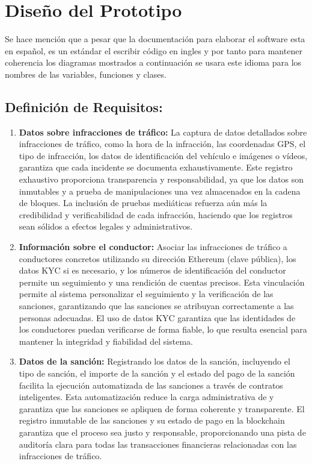 \section{Diseño del Prototipo }
Se hace mención que a pesar que la documentación para elaborar el software esta en español, es un estándar el escribir código en ingles y por tanto para mantener coherencia los diagramas mostrados a continuación se usara este idioma para los nombres de las variables, funciones y clases.
\subsection{Definición de Requisitos:  }
    
\begin{enumerate}
    \item \textbf{Datos sobre infracciones de tráfico:} La captura de datos detallados sobre infracciones de tráfico, como la hora de la infracción, las coordenadas GPS, el tipo de infracción, los datos de identificación del vehículo e imágenes o vídeos, garantiza que cada incidente se documenta exhaustivamente. Este registro exhaustivo proporciona transparencia y responsabilidad, ya que los datos son inmutables y a prueba de manipulaciones una vez almacenados en la cadena de bloques. La inclusión de pruebas mediáticas refuerza aún más la credibilidad y verificabilidad de cada infracción, haciendo que los registros sean sólidos a efectos legales y administrativos. 
    \item \textbf{Información sobre el conductor:} Asociar las infracciones de tráfico a conductores concretos utilizando su dirección Ethereum (clave pública), los datos KYC si es necesario, y los números de identificación del conductor permite un seguimiento y una rendición de cuentas precisos. Esta vinculación permite al sistema personalizar el seguimiento y la verificación de las sanciones, garantizando que las sanciones se atribuyan correctamente a las personas adecuadas. El uso de datos KYC garantiza que las identidades de los conductores puedan verificarse de forma fiable, lo que resulta esencial para mantener la integridad y fiabilidad del sistema.
    \item \textbf{Datos de la sanción: }  Registrando los datos de la sanción, incluyendo el tipo de sanción, el importe de la sanción y el estado del pago de la sanción facilita la ejecución automatizada de las sanciones a través de contratos inteligentes. Esta automatización reduce la carga administrativa de y garantiza que las sanciones se apliquen de forma coherente y transparente. El registro inmutable de las sanciones y su estado de pago en la blockchain garantiza que el proceso sea justo y responsable, proporcionando una pista de auditoría clara para todas las transacciones financieras relacionadas con las infracciones de tráfico.

\end{enumerate}
